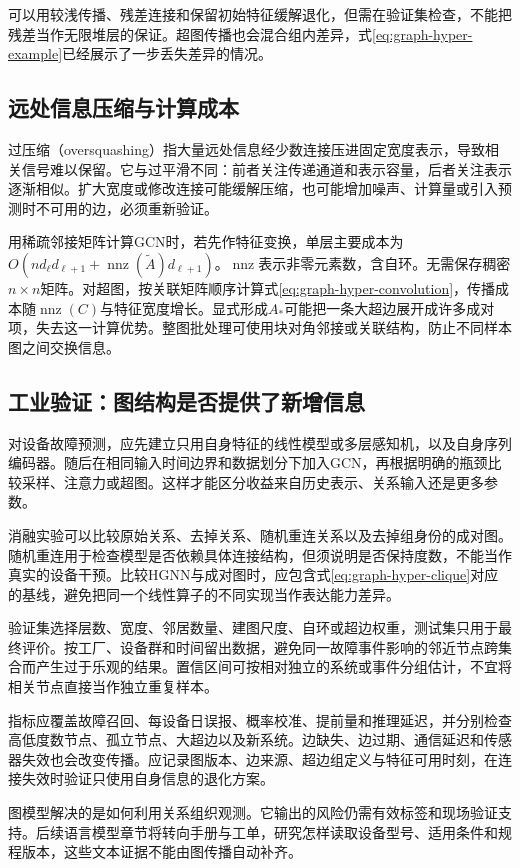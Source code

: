 可以用较浅传播、残差连接和保留初始特征缓解退化，但需在验证集检查，不能把残差当作无限堆层的保证。超图传播也会混合组内差异，式\eqref{eq:graph-hyper-example}已经展示了一步丢失差异的情况。

\subsection{远处信息压缩与计算成本}
过压缩（oversquashing）指大量远处信息经少数连接压进固定宽度表示，导致相关信号难以保留。它与过平滑不同：前者关注传递通道和表示容量，后者关注表示逐渐相似。扩大宽度或修改连接可能缓解压缩，也可能增加噪声、计算量或引入预测时不可用的边，必须重新验证。

用稀疏邻接矩阵计算GCN时，若先作特征变换，单层主要成本为$O(nd_\ell d_{\ell+1}+\operatorname{nnz}(\widetilde A)d_{\ell+1})$。$\operatorname{nnz}$表示非零元素数，含自环。无需保存稠密$n\times n$矩阵。对超图，按关联矩阵顺序计算式\eqref{eq:graph-hyper-convolution}，传播成本随$\operatorname{nnz}(C)$与特征宽度增长。显式形成$A_*$可能把一条大超边展开成许多成对项，失去这一计算优势。整图批处理可使用块对角邻接或关联结构，防止不同样本图之间交换信息。

\subsection{工业验证：图结构是否提供了新增信息}
对设备故障预测，应先建立只用自身特征的线性模型或多层感知机，以及自身序列编码器。随后在相同输入时间边界和数据划分下加入GCN，再根据明确的瓶颈比较采样、注意力或超图。这样才能区分收益来自历史表示、关系输入还是更多参数。

消融实验可以比较原始关系、去掉关系、随机重连关系以及去掉组身份的成对图。随机重连用于检查模型是否依赖具体连接结构，但须说明是否保持度数，不能当作真实的设备干预。比较HGNN与成对图时，应包含式\eqref{eq:graph-hyper-clique}对应的基线，避免把同一个线性算子的不同实现当作表达能力差异。

验证集选择层数、宽度、邻居数量、建图尺度、自环或超边权重，测试集只用于最终评价。按工厂、设备群和时间留出数据，避免同一故障事件影响的邻近节点跨集合而产生过于乐观的结果。置信区间可按相对独立的系统或事件分组估计，不宜将相关节点直接当作独立重复样本。

指标应覆盖故障召回、每设备日误报、概率校准、提前量和推理延迟，并分别检查高低度数节点、孤立节点、大超边以及新系统。边缺失、边过期、通信延迟和传感器失效也会改变传播。应记录图版本、边来源、超边组定义与特征可用时刻，在连接失效时验证只使用自身信息的退化方案。

图模型解决的是如何利用关系组织观测。它输出的风险仍需有效标签和现场验证支持。后续语言模型章节将转向手册与工单，研究怎样读取设备型号、适用条件和规程版本，这些文本证据不能由图传播自动补齐。

